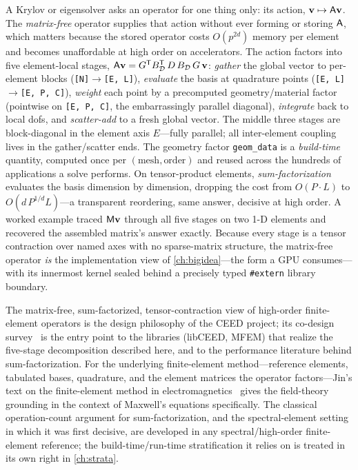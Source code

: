 \summarysection
A Krylov or eigensolver asks an operator for one thing only: its action,
$\mathbf{v}\mapsto\mathsf{A}\mathbf{v}$. The \emph{matrix-free} operator supplies that action
without ever forming or storing $\mathsf{A}$, which matters because the stored
operator costs $O(p^{2d})$ memory per element and becomes unaffordable at high
order on accelerators. The action factors into five element-local stages,
$\mathsf{A}\mathbf{v} = G^{\mathsf T}B_{\mathcal{D}}^{\mathsf T}\,D\,B_{\mathcal{D}}\,G\,\mathbf{v}$:
\emph{gather} the global vector to per-element blocks
(\lstinline[style=l4style]|[N]|$\to$\lstinline[style=l4style]|[E, L]|),
\emph{evaluate} the basis at quadrature points
(\lstinline[style=l4style]|[E, L]|$\to$\lstinline[style=l4style]|[E, P, C]|),
\emph{weight} each point by a precomputed geometry/material factor (pointwise on
\lstinline[style=l4style]|[E, P, C]|, the embarrassingly parallel diagonal),
\emph{integrate} back to local dofs, and \emph{scatter-add} to a fresh global
vector. The middle three stages are block-diagonal in the element axis $E$---fully
parallel; all inter-element coupling lives in the gather/scatter ends. The
geometry factor \texttt{geom\_data} is a \emph{build-time} quantity, computed once
per $(\text{mesh},\text{order})$ and reused across the hundreds of applications a
solve performs. On tensor-product elements, \emph{sum-factorization} evaluates the
basis dimension by dimension, dropping the cost from $O(P\cdot L)$ to
$O(d\,P^{1/d}L)$---a transparent reordering, same answer, decisive at high order.
A worked example traced $\mathsf{M}\mathbf{v}$ through all five stages on two 1-D elements
and recovered the assembled matrix's answer exactly. Because every stage is a
tensor contraction over named axes with no sparse-matrix structure, the
matrix-free operator \emph{is} the implementation view of \cref{ch:bigidea}---the
form a GPU consumes---with its innermost kernel sealed behind a precisely typed
\lstinline[style=l4style]|#extern| library boundary.

\furtherreading
The matrix-free, sum-factorized, tensor-contraction view of high-order
finite-element operators is the design philosophy of the CEED project; its
co-design survey~\citep{ceed2021} is the entry point to the libraries (libCEED,
MFEM) that realize the five-stage decomposition described here, and to the
performance literature behind sum-factorization. For the underlying
finite-element method---reference elements, tabulated bases, quadrature, and the
element matrices the operator factors---Jin's text on the finite-element method in
electromagnetics~\citep{jin2014} gives the field-theory grounding in the
context of Maxwell's equations specifically. The classical operation-count
argument for sum-factorization, and the spectral-element setting in which it was
first decisive, are developed in any spectral/high-order finite-element reference;
the build-time/run-time stratification it relies on is treated in its own right in
\cref{ch:strata}.

